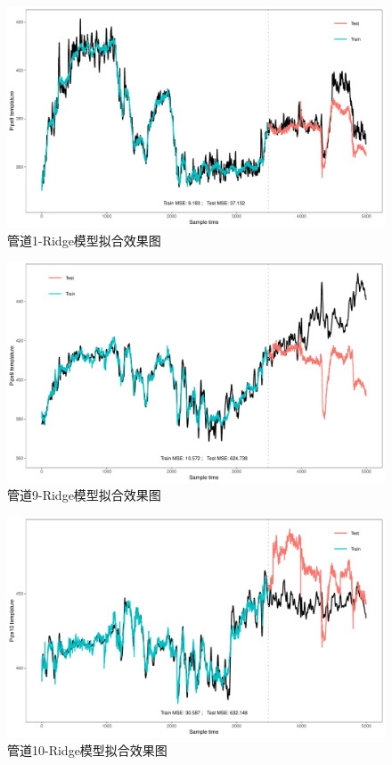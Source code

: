 \documentclass[
]{article}
\begin{document}
\begin{figure}

{\centering \includegraphics{TJRJCP_DuXingx_202105_files/figure-latex/unnamed-chunk-36-1} 

}

\caption{管道1-Ridge模型拟合效果图}\label{fig:unnamed-chunk-36}
\end{figure}

\begin{figure}

{\centering \includegraphics{TJRJCP_DuXingx_202105_files/figure-latex/unnamed-chunk-37-1} 

}

\caption{管道9-Ridge模型拟合效果图}\label{fig:unnamed-chunk-37}
\end{figure}

\begin{figure}

{\centering \includegraphics{TJRJCP_DuXingx_202105_files/figure-latex/unnamed-chunk-38-1} 

}

\caption{管道10-Ridge模型拟合效果图}\label{fig:unnamed-chunk-38}
\end{figure}
\end{document}
